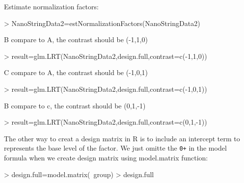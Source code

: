 \documentclass[12pt]{article}
\begin{document}
Estimate normalization factors:
\begin{Schunk}
\begin{Sinput}
> NanoStringData2=estNormalizationFactors(NanoStringData2)
\end{Sinput}
\end{Schunk}

B compare to A, the contrast should be (-1,1,0)
\begin{Schunk}
\begin{Sinput}
> result=glm.LRT(NanoStringData2,design.full,contrast=c(-1,1,0))
\end{Sinput}
\end{Schunk}


C compare to A, the contrast should be (-1,0,1)
\begin{Schunk}
\begin{Sinput}
> result=glm.LRT(NanoStringData2,design.full,contrast=c(-1,0,1))
\end{Sinput}
\end{Schunk}


B compare to c, the contrast should be (0,1,-1)
\begin{Schunk}
\begin{Sinput}
> result=glm.LRT(NanoStringData2,design.full,contrast=c(0,1,-1))
\end{Sinput}
\end{Schunk}




The other way to creat a design matrix in R is to include an intercept 
term to represents the base level of the factor. We just omitte 
the {\tt 0+} in the model formula when we create design matrix using 
model.matrix function:

\begin{Schunk}
\begin{Sinput}
> design.full=model.matrix(~group)
> design.full
\end{Sinput}
\end{Schunk}
\end{document}
